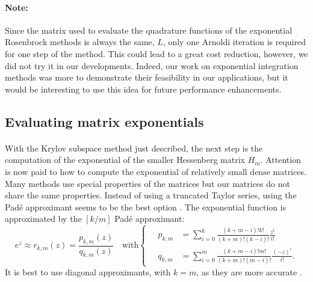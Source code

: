       \paragraph{Note:}
      Since the matrix used to evaluate the quadrature functions of the exponential Rosenbrock methods is always the same, $L$, only one Arnoldi iteration is required for one step of the method.
      This could lead to a great cost reduction, however, we did not try it in our developments.
      Indeed, our work on exponential integration methods was more to demonstrate their feasibility in our applications, but it would be interesting to use this idea for future performance enhancements.


    \subsection{Evaluating matrix exponentials}

      \paragraph{}
      With the Krylov subspace method just described, the next step is the computation of the exponential of the smaller Hessenberg matrix $H_m$.
      Attention is now paid to how to compute the exponential of relatively small dense matrices.
      Many methods use special properties of the matrices but our matrices do not share the same properties.
      Instead of using a truncated Taylor series, using the Padé approximant seems to be the best option \cite{HighamAlMohy2010}.
      The exponential function is approximated by the $\left[k/m\right]$ Padé approximant:
      \begin{equation}
        e^z \approx r_{k,m}\left(z\right) = \frac{p_{k,m}\left(z\right)}{q_{k,m}\left(z\right)} \quad\textrm{with} \left\{\begin{aligned}
          \quad p_{k,m} &= \sum_{i = 0}^k \frac{\left(k + m - i\right)! k!}{\left(k + m\right)! \left(k - i\right)!} \frac{z^i}{i!} \\
          \quad q_{k,m} &= \sum_{i = 0}^m \frac{\left(k + m - i\right)! m!}{\left(k + m\right)! \left(m - i\right)!} \frac{\left(-z\right)^i}{i!} .
        \end{aligned}\right.
      \end{equation}
      It is best to use diagonal approximants, with $k = m$, as they are more accurate \cite{HighamAlMohy2010}.

